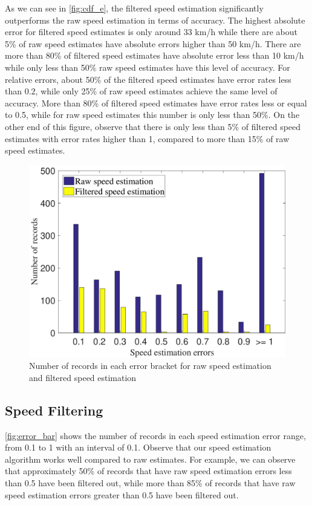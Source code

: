 As we can see in \autoref{fig:cdf_e}, the filtered speed estimation significantly outperforms the raw speed estimation in terms of accuracy. The highest absolute error for filtered speed estimates is only around 33 km/h while there are about 5\% of raw speed estimates have absolute errors higher than 50 km/h. There are more than 80\% of filtered speed estimates have absolute error less than 10 km/h while only less than 50\% raw speed estimates have this level of accuracy. For relative errors, about 50\% of the filtered speed estimates have error rates less than $0.2$, while only 25\% of raw speed estimates achieve the same level of accuracy. More than 80\% of filtered speed estimates have error rates less or equal to 0.5, while for raw speed estimates this number is only less than 50\%. On the other end of this figure, observe that there is only less than 5\% of filtered speed estimates with error rates higher than 1, compared to more than 15\% of raw speed estimates.


\begin{figure}[h]
    \centering
    \includegraphics[width=0.5\linewidth]{./figures/error_bar.pdf}
    \caption{Number of records in each error bracket for raw speed estimation and filtered speed estimation}
    \label{fig:error_bar}
\end{figure}


\subsection{Speed Filtering}

\autoref{fig:error_bar} shows the number of records in each speed estimation error range, from 0.1 to 1 with an interval of 0.1. Observe that our speed estimation algorithm works well compared to raw estimates. For example, we can observe that approximately 50\% of records that have raw speed estimation errors less than 0.5 have been filtered out, while more than 85\% of records that have raw speed estimation errors greater than 0.5 have been filtered out.
